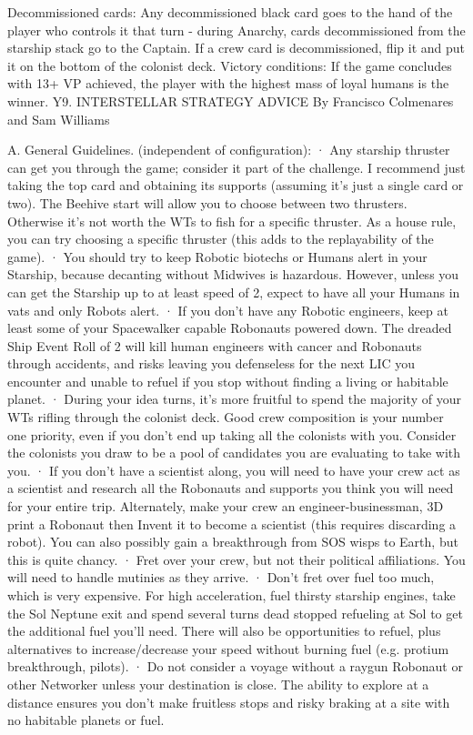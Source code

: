 \documentclass[a4paper]{book}
\begin{document}
Decommissioned cards: Any decommissioned black card goes to the hand of the player who controls it that turn - during Anarchy, cards decommissioned from the starship stack go to the Captain. If a crew card is decommissioned, flip it and put it on the bottom of the colonist deck.
Victory conditions: If the game concludes with 13+ VP achieved, the player with the highest mass of loyal humans is the winner.
Y9. INTERSTELLAR STRATEGY ADVICE
By Francisco Colmenares and Sam Williams

A. General Guidelines. (independent of configuration):
·       Any starship thruster can get you through the game; consider it part of the challenge. I recommend just taking the top card and obtaining its supports (assuming it’s just a single card or two). The Beehive start will allow you to choose between two thrusters. Otherwise it’s not worth the WTs to fish for a specific thruster. As a house rule, you can try choosing a specific thruster (this adds to the replayability of the game).
·       You should try to keep Robotic biotechs or Humans alert in your Starship, because decanting without Midwives is hazardous. However, unless you can get the Starship up to at least speed of 2, expect to have all your Humans in vats and only Robots alert.
·       If you don’t have any Robotic engineers, keep at least some of your Spacewalker capable Robonauts powered down. The dreaded Ship Event Roll of 2 will kill human engineers with cancer and Robonauts through accidents, and risks leaving you defenseless for the next LIC you encounter and unable to refuel if you stop without finding a living or habitable planet.
·       During your idea turns, it’s more fruitful to spend the majority of your WTs rifling through the colonist deck. Good crew composition is your number one priority, even if you don’t end up taking all the colonists with you. Consider the colonists you draw to be a pool of candidates you are evaluating to take with you.
·       If you don’t have a scientist along, you will need to have your crew act as a scientist and research all the Robonauts and supports you think you will need for your entire trip. Alternately, make your crew an engineer-businessman, 3D print a Robonaut then Invent it to become a scientist (this requires discarding a robot). You can also possibly gain a breakthrough from SOS wisps to Earth, but this is quite chancy.
·       Fret over your crew, but not their political affiliations. You will need to handle mutinies as they arrive.
·       Don’t fret over fuel too much, which is very expensive. For high acceleration, fuel thirsty starship engines, take the Sol Neptune exit and spend several turns dead stopped refueling at Sol to get the additional fuel you’ll need. There will also be opportunities to refuel, plus alternatives to increase/decrease your speed without burning fuel (e.g. protium breakthrough, pilots).
·       Do not consider a voyage without a raygun Robonaut or other Networker unless your destination is close. The ability to explore at a distance ensures you don’t make fruitless stops and risky braking at a site with no habitable planets or fuel.
 
\end{document}
